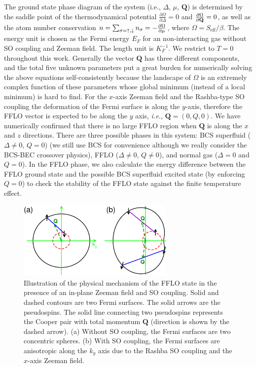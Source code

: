 \documentclass[prl,showpacs,twocolumn]{revtex4}
\begin{document}
The ground state phase diagram of the system (i.e., $\Delta $, $\mu $, $%
\mathbf{Q}$) is determined by the saddle point of the thermodynamical
potential ${\frac{\partial \Omega }{\partial \Delta }}=0$ and ${\frac{%
\partial \Omega }{\partial \mathbf{Q}}}=0$, as well as the atom number
conservation $n=\sum_{\sigma =\uparrow ,\downarrow }n_{\sigma }=-{\frac{%
\partial \Omega }{\partial \mu }}$, where $\Omega =S_{\text{eff}}/\beta $.
The energy unit is chosen as the Fermi energy $E_{F}$ for an non-interacting
gas without SO coupling and Zeeman field. The length unit is $K_{F}^{-1}$.
We restrict to $T=0$ throughout this work. Generally the vector $\mathbf{Q}$
has three different components, and the total five unknown parameters put a
great burden for numerically solving the above equations self-consistently
because the landscape of $\Omega $ is an extremely complex function of these
parameters whose global minimum (instead of a local minimum) is hard to
find. For the $x$-axis Zeeman field and the Rashba-type SO coupling the
deformation of the Fermi surface is along the $y$-axis, therefore the FFLO
vector is expected to be along the $y$ axis, \textit{i.e.}, $\mathbf{Q}%
=(0,Q,0)$. We have numerically confirmed that there is no large FFLO region
when $\mathbf{Q}$ is along the $x$ and $z$ directions. There are three
possible phases in this system: BCS superfluid ($\Delta \neq 0$, $Q=0$) (we
still use BCS for convenience although we really consider the BCS-BEC
crossover physics), FFLO ($\Delta \neq 0$, $Q\neq 0$), and normal gas ($%
\Delta =0$ and $Q=0$). In the FFLO phase, we also calculate the energy
difference between the FFLO ground state and the possible BCS superfluid
excited state (by enforcing $Q=0$) to check the stability of the FFLO state
against the finite temperature effect.

\begin{figure}[t]
\centering
\includegraphics[width=3.0in]{Fermi-Surface.eps}
\caption{Illustration of the physical mechanism of the FFLO state in the
presence of an in-plane Zeeman field and SO coupling. Solid and dashed
contours are two Fermi surfaces. The solid arrows are the pseudospins. The
solid line connecting two pseudospins represents the Cooper pair with total
momentum $\mathbf{Q}$ (direction is shown by the dashed arrow). (a) Without
SO coupling, the Fermi surfaces are two concentric spheres. (b) With SO
coupling, the Fermi surfaces are anisotropic along the $k_{y}$ axis due to
the Rashba SO coupling and the $x$-axis Zeeman field.}
\label{fig-idea}
\end{figure}
\end{document}
